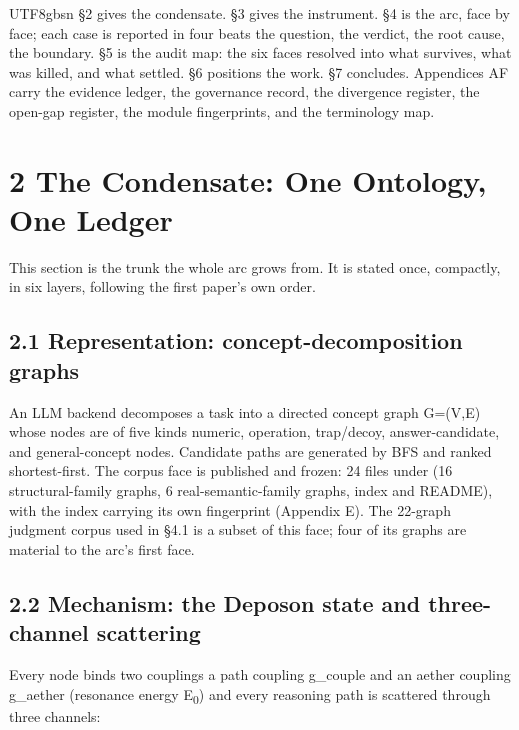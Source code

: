 \documentclass[11pt,letterpaper]{article}
\begin{document}
\begin{CJK}{UTF8}{gbsn}
\S{}2 gives the condensate. \S{}3 gives the instrument. \S{}4 is the arc, face by face; each case is reported in four beats \textemdash{} the question, the verdict, the root cause, the boundary. \S{}5 is the audit map: the six faces resolved into what survives, what was killed, and what settled. \S{}6 positions the work. \S{}7 concludes. Appendices A\textendash{}F carry the evidence ledger, the governance record, the divergence register, the open-gap register, the module fingerprints, and the terminology map.

\section*{2 The Condensate: One Ontology, One Ledger}

This section is the trunk the whole arc grows from. It is stated once, compactly, in six layers, following the first paper's own order.

\subsection*{2.1 Representation: concept-decomposition graphs}

An LLM backend decomposes a task into a directed concept graph G=(V,E) whose nodes are of five kinds \textemdash{} numeric, operation, trap/decoy, answer-candidate, and general-concept nodes. Candidate paths are generated by BFS and ranked shortest-first. The corpus face is published and frozen: 24 files under  (16 structural-family graphs, 6 real-semantic-family graphs, index and README), with the index carrying its own fingerprint (Appendix E). The 22-graph judgment corpus used in \S{}4.1 is a subset of this face; four of its graphs are material to the arc's first face.

\subsection*{2.2 Mechanism: the Deposon state and three-channel scattering}

Every node binds two couplings \textemdash{} a path coupling g\_couple and an aether coupling g\_aether (resonance energy E\textsubscript{0}) \textemdash{} and every reasoning path is scattered through three channels:


\end{CJK}
\end{document}
